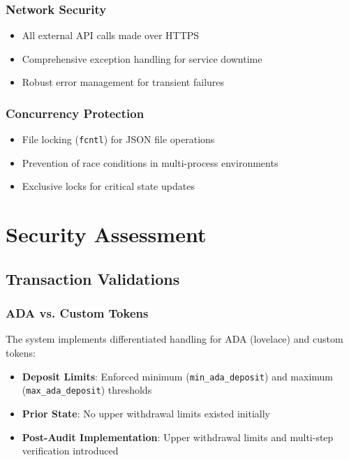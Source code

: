 \documentclass[11pt,a4paper]{article}
\begin{document}
\subsubsection{Network Security}
\begin{itemize}
    \item All external API calls made over HTTPS
    \item Comprehensive exception handling for service downtime
    \item Robust error management for transient failures
\end{itemize}

\subsubsection{Concurrency Protection}
\begin{itemize}
    \item File locking (\texttt{fcntl}) for JSON file operations
    \item Prevention of race conditions in multi-process environments
    \item Exclusive locks for critical state updates
\end{itemize}

\section{Security Assessment}

\subsection{Transaction Validations}

\subsubsection{ADA vs. Custom Tokens}
The system implements differentiated handling for ADA (lovelace) and custom tokens:

\begin{itemize}
    \item \textbf{Deposit Limits}: Enforced minimum (\texttt{min\_ada\_deposit}) and maximum (\texttt{max\_ada\_deposit}) thresholds
    \item \textbf{Prior State}: No upper withdrawal limits existed initially
    \item \textbf{Post-Audit Implementation}: Upper withdrawal limits and multi-step verification introduced
\end{itemize}
\end{document}
